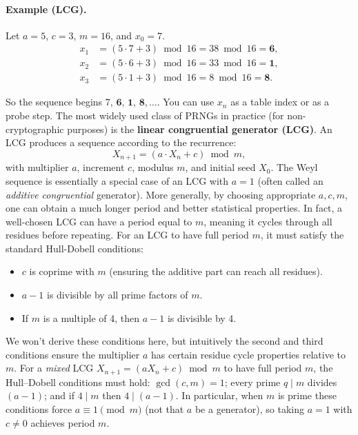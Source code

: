 \documentclass[11pt]{article}
\begin{document}
\paragraph{Example (LCG).}
Let \(a=5\), \(c=3\), \(m=16\), and \(x_0=7\).
\[
\begin{aligned}
x_1 &= (5\cdot 7 + 3)\bmod 16 = 38\bmod 16 = \mathbf{6},\\
x_2 &= (5\cdot 6 + 3)\bmod 16 = 33\bmod 16 = \mathbf{1},\\
x_3 &= (5\cdot 1 + 3)\bmod 16 = 8\bmod 16 = \mathbf{8}.
\end{aligned}
\]

So the sequence begins \(7,\,\mathbf{6},\,\mathbf{1},\,\mathbf{8},\dots\). You can use \(x_n\) as a table index or as a probe step.
The most widely used class of PRNGs in practice (for non-cryptographic purposes) is the \textbf{linear congruential generator (LCG)}. An LCG produces a sequence according to the recurrence:
\[ X_{n+1} = (a \cdot X_n + c) \bmod m, \]
with multiplier $a$, increment $c$, modulus $m$, and initial seed $X_0$. The Weyl sequence is essentially a special case of an LCG with $a=1$ (often called an \emph{additive congruential} generator). More generally, by choosing appropriate $a, c, m$, one can obtain a much longer period and better statistical properties. In fact, a well-chosen LCG can have a period equal to $m$, meaning it cycles through all residues before repeating. For an LCG to have full period $m$, it must satisfy the standard Hull-Dobell conditions:
\begin{itemize}
  \item $c$ is coprime with $m$ (ensuring the additive part can reach all residues).
  \item $a-1$ is divisible by all prime factors of $m$.
  \item If $m$ is a multiple of 4, then $a-1$ is divisible by 4.
\end{itemize}
We won’t derive these conditions here, but intuitively the second and third conditions ensure the multiplier $a$ has certain residue cycle properties relative to $m$. For a \emph{mixed} LCG $X_{n+1}=(aX_n+c)\bmod m$ to have full period $m$, the Hull–Dobell conditions must hold: $\gcd(c,m)=1$; every prime $q\mid m$ divides $(a-1)$; and if $4\mid m$ then $4\mid(a-1)$. In particular, when $m$ is prime these conditions force $a\equiv 1\pmod m$ (not that $a$ be a generator), so taking $a=1$ with $c\neq 0$ achieves period $m$.
\end{document}
